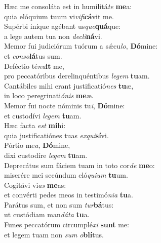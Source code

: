 \evenverse Hæc me consoláta est in humilitá\textit{te} \textbf{me}a:~\*\\
\evenverse quia elóquium tuum vi\textit{vi}\textit{fi}\textbf{cá}vit me.\\
\oddverse Supérbi iníque agébant us\textit{que}\textbf{quá}que:~\*\\
\oddverse a lege autem tua non \textit{de}\textit{cli}\textbf{ná}vi.\\
\evenverse Memor fui judiciórum tuórum a sǽcu\textit{lo}, \textbf{Dó}mine:~\*\\
\evenverse et \textit{con}\textit{so}\textbf{lá}tus sum.\\
\oddverse Deféctio té\textit{nu}\textbf{it} me,~\*\\
\oddverse pro peccatóribus derelinquéntibus \textit{le}\textit{gem} \textbf{tu}am.\\
\evenverse Cantábiles mihi erant justificatió\textit{nes} \textbf{tu}æ,~\*\\
\evenverse in loco peregrinati\textit{ó}\textit{nis} \textbf{me}æ.\\
\oddverse Memor fui nocte nóminis tu\textit{i}, \textbf{Dó}mine:~\*\\
\oddverse et custodívi \textit{le}\textit{gem} \textbf{tu}am.\\
\evenverse Hæc facta \textit{est} \textbf{mi}hi:~\*\\
\evenverse quia justificatiónes tuas \textit{ex}\textit{qui}\textbf{sí}vi.\\
\oddverse Pórtio me\textit{a}, \textbf{Dó}mine,~\*\\
\oddverse dixi custodíre \textit{le}\textit{gem} \textbf{tu}am.\\
\evenverse Deprecátus sum fáciem tuam in toto cor\textit{de} \textbf{me}o:~\*\\
\evenverse miserére mei secúndum eló\textit{qui}\textit{um} \textbf{tu}um.\\
\oddverse Cogitávi vi\textit{as} \textbf{me}as:~\*\\
\oddverse et convérti pedes meos in testimó\textit{ni}\textit{a} \textbf{tu}a.\\
\evenverse Parátus sum, et non sum \textit{tur}\textbf{bá}tus:~\*\\
\evenverse ut custódiam man\textit{dá}\textit{ta} \textbf{tu}a.\\
\oddverse Funes peccatórum circumplé\textit{xi} \textbf{sunt} me:~\*\\
\oddverse et legem tuam non \textit{sum} \textit{o}\textbf{blí}tus.\\
